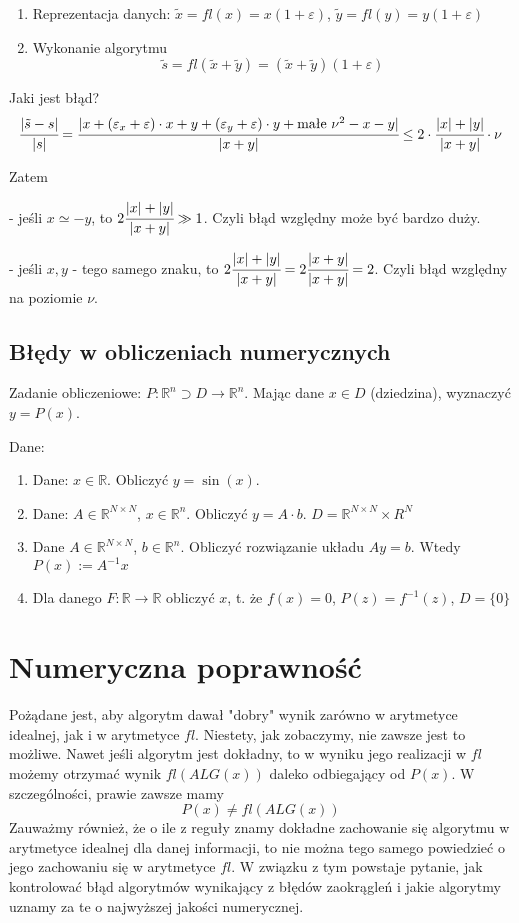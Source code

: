 \documentclass[hidelinks,a4paper,fleqn,oneside]{book}
\newcommand{\RR}{\mathbb{R}}
\newcommand{\ra}{\rightarrow}
\begin{document}
\begin{enumerate}
	\item Reprezentacja danych: $\tilde{x} = fl(x) = x(1+\varepsilon)$,
	      $\tilde{y} = fl(y) = y(1 + \varepsilon)$
	\item Wykonanie algorytmu
	      \[
	      	\tilde{s} = fl(\tilde{x} + \tilde{y}) = (\tilde{x} + \tilde{y})(1 + \varepsilon)
	      \]
\end{enumerate}

Jaki jest błąd?
\[
	\cfrac{|\tilde{s} - s|}{|s|} = \cfrac{|x + (\varepsilon_x + \varepsilon)\cdot x + y + (\varepsilon_y + \varepsilon)\cdot y + \textrm{małe }\nu^2 - x - y|}{|x + y|} \leq 2 \cdot \cfrac{|x|+|y|}{|x+y|} \cdot \nu
\]

Zatem

- jeśli $x \simeq -y$, to $2\cfrac{|x|+|y|}{|x+y|} \gg 1$. Czyli błąd względny może być bardzo duży.

- jeśli $x, y$ - tego samego znaku, to $2 \cfrac{|x|+|y|}{|x+y|} = 2 \cfrac{|x+y|}{|x+y|} = 2$. Czyli błąd względny na poziomie $\nu$.

\subsection{Błędy w obliczeniach numerycznych}

Zadanie obliczeniowe: $P: \RR^n \supset D \ra \RR^n$. Mając dane $x \in D$ (dziedzina), wyznaczyć $y = P(x)$.

Dane:

\begin{enumerate}
	\item Dane: $x \in \RR$. Obliczyć $y=\sin(x)$.
	\item Dane: $A \in \RR^{N \times N}$, $x \in \RR^n$. Obliczyć $y = A \cdot b$.
	      $D = \RR^{N \times N} \times R^N$
	\item Dane $A \in \RR^{N \times N}$, $b \in \RR^n$. Obliczyć rozwiązanie układu $Ay = b$. Wtedy $P(x) := A^{-1}x$
	\item Dla danego $F: \RR \ra \RR$ obliczyć $x$, t. że $f(x) = 0$,
	      $P(z) = f^{-1}(z)$, $D = \{0\}$
\end{enumerate}


\section{Numeryczna poprawność}

Pożądane jest, aby algorytm dawał "dobry" wynik zarówno w arytmetyce idealnej, jak i w arytmetyce $fl$. Niestety, jak zobaczymy, nie zawsze jest to możliwe. Nawet jeśli algorytm jest dokładny, to w wyniku jego realizacji w $fl$ możemy otrzymać wynik $fl(ALG(x))$ daleko odbiegający od $P(x)$. W szczególności, prawie zawsze mamy
\[P(x) \neq fl(ALG(x))\]
Zauważmy również, że o ile z reguły znamy dokładne zachowanie się algorytmu w arytmetyce idealnej dla danej informacji, to nie można tego samego powiedzieć o jego zachowaniu się w arytmetyce $fl$. W związku z tym powstaje pytanie, jak kontrolować błąd algorytmów wynikający z błędów zaokrągleń i jakie algorytmy uznamy za te o najwyższej jakości numerycznej.
\end{document}
